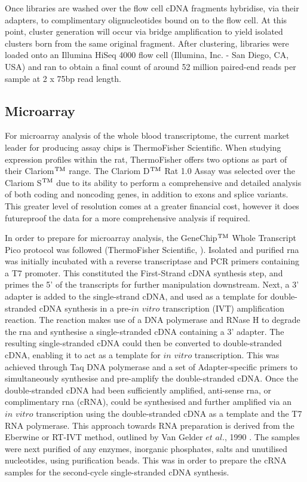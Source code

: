 Once libraries are washed over the flow cell cDNA fragments hybridise, via their adapters, to complimentary olignucleotides bound on to the flow cell. At this point, cluster generation will occur via bridge amplification to yield isolated clusters born from the same original fragment. After clustering, libraries were loaded onto an Illumina HiSeq 4000 flow cell (Illumina, Inc. - San Diego, CA, USA) and ran to obtain a final count of around 52 million paired-end reads per sample at 2 x 75bp read length. 

\subsection{Microarray}

For microarray analysis of the whole blood transcriptome, the current market leader for producing assay chips is ThermoFisher Scientific. When studying expression profiles within the rat, ThermoFisher offers two options as part of their Clariom$\textsuperscript{TM}$ range. The Clariom D$\textsuperscript{TM}$ Rat 1.0 Assay was selected over the Clariom S$\textsuperscript{TM}$ due to its ability to perform a comprehensive and detailed analysis of both coding and noncoding genes, in addition to exons and splice variants. This greater level of resolution comes at a greater financial cost, however it does futureproof the data for a more comprehensive analysis if required.

In order to prepare for microarray analysis, the GeneChip$\textsuperscript{TM}$ Whole Transcript Pico protocol was followed (ThermoFisher Scientific, \cite{Applied}). Isolated and purified \acrshort{rna} was initially incubated with a reverse transcriptase and PCR primers containing a T7 promoter. This constituted the First-Strand cDNA synthesis step, and primes the 5' of the transcripts for further manipulation downstream. Next, a 3' adapter is added to the single-strand cDNA, and used as a template for double-stranded cDNA synthesis in a pre-$\textit{in vitro}$ transcription (IVT) amplification reaction. The reaction makes use of a DNA polymerase and RNase H to degrade the \acrshort{rna} and synthesise a single-stranded cDNA containing a 3' adapter. The resulting single-stranded cDNA could then be converted to double-stranded cDNA, enabling it to act as a template for $\textit{in vitro}$ transcription. This was achieved through Taq DNA polymerase and a set of Adapter-specific primers to simultaneously synthesise and pre-amplify the double-stranded cDNA. Once the double-stranded cDNA had been sufficiently amplified, anti-sense \acrshort{rna}, or complimentary \acrshort{rna} (cRNA), could be synthesised and further amplified via an $\textit{in vitro}$ transcription using the double-stranded cDNA as a template and the T7 RNA polymerase. This approach towards RNA preparation is derived from the Eberwine or RT-IVT method, outlined by Van Gelder $\textit{et al.}$, 1990 \cite{VanGelder1990}. The samples were next purified of any enzymes, inorganic phosphates, salts and unutilised nucleotides, using purification beads. This was in order to prepare the cRNA samples for the second-cycle single-stranded cDNA synthesis. 

